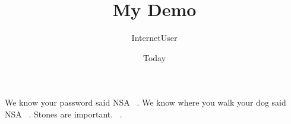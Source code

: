 \documentclass[11pt]{article}
\begin{document}
\title{My Demo}
\author{InternetUser}
\date{Today}
\maketitle

We know your password said NSA ~\cite{NSA}.
We know where you walk your dog said NSA ~\cite{AU7}.
Stones are important. ~\cite{5A6V}.


{}

\end{document}
